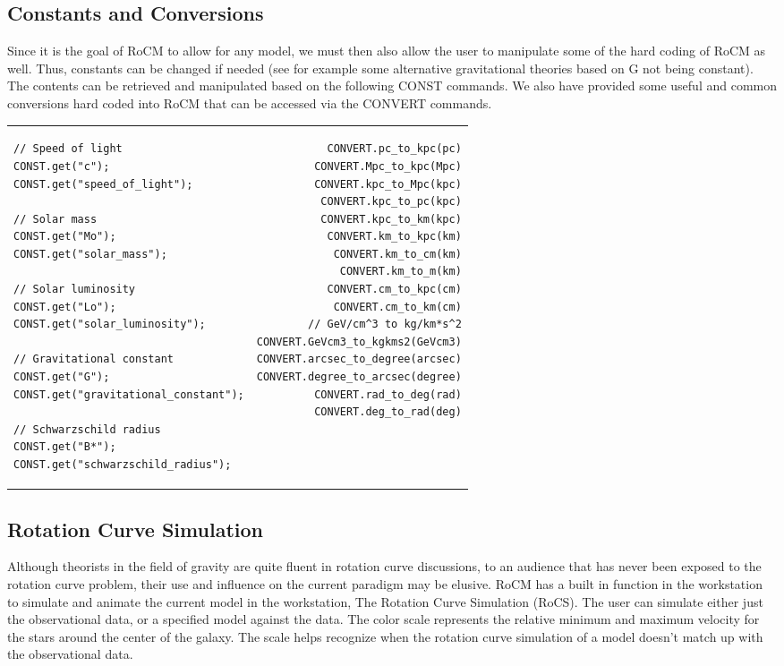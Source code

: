 \documentclass[conference]{IEEEtran-modified}
\begin{document}
\subsection{Constants and Conversions}
Since it is the goal of RoCM to allow for any model, we must then also allow the user to manipulate some of the hard coding of RoCM as well.  Thus, constants can be changed if needed (see for example some alternative gravitational theories based on G not being constant). The contents can be retrieved and manipulated based on the following CONST commands. We also have provided some useful and common conversions hard coded into RoCM that can be accessed via the CONVERT commands.\begin{center}
\begin{tabular}{l !{\color{lightgray}\vrule} r}
\begin{lstlisting}
// Speed of light
CONST.get("c");
CONST.get("speed_of_light");

// Solar mass
CONST.get("Mo");
CONST.get("solar_mass");

// Solar luminosity
CONST.get("Lo");
CONST.get("solar_luminosity");

// Gravitational constant
CONST.get("G");
CONST.get("gravitational_constant");

// Schwarzschild radius
CONST.get("B*");
CONST.get("schwarzschild_radius");
\end{lstlisting}
&
\begin{lstlisting}
CONVERT.pc_to_kpc(pc)
CONVERT.Mpc_to_kpc(Mpc)
CONVERT.kpc_to_Mpc(kpc)
CONVERT.kpc_to_pc(kpc)
CONVERT.kpc_to_km(kpc)
CONVERT.km_to_kpc(km)
CONVERT.km_to_cm(km)
CONVERT.km_to_m(km)
CONVERT.cm_to_kpc(cm)
CONVERT.cm_to_km(cm)
// GeV/cm^3 to kg/km*s^2
CONVERT.GeVcm3_to_kgkms2(GeVcm3)
CONVERT.arcsec_to_degree(arcsec)
CONVERT.degree_to_arcsec(degree)
CONVERT.rad_to_deg(rad)
CONVERT.deg_to_rad(deg)
\end{lstlisting}
\end{tabular}
\end{center}


\subsection{Rotation Curve Simulation}

Although theorists in the field of gravity are quite fluent in rotation curve discussions, to an audience that has never been exposed to the rotation curve problem, their use and influence on the current paradigm may be elusive. RoCM has a built in function in the workstation to simulate and animate the current model in the workstation, The Rotation Curve Simulation (RoCS). The user can simulate either just the observational data, or a specified model against the data. The color scale represents the relative {\color[HTML]{EA051C} minimum} and {\color[HTML]{1AAF3A} maximum} velocity for the stars around the center of the galaxy. The scale helps recognize when the rotation curve simulation of a model doesn't match up with the observational data.
\end{document}
